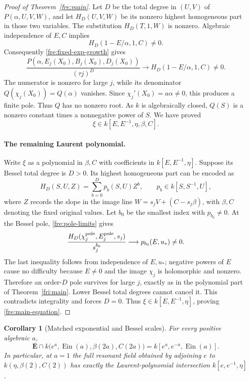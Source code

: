 \documentclass[11pt]{article}
\newtheorem{corollary}[theorem]{Corollary}
\theoremstyle{definition}
\theoremstyle{remark}
\newcommand{\Ein}{\operatorname{Ein}}
\begin{document}
\begin{proof}[Proof of Theorem~\ref{fre:main}]
Let $D$ be the total degree in $(U,V)$ of
$P(\alpha,U,V,W)$, and let $H_D(U,V,W)$ be its nonzero highest
homogeneous part in those two variables.  The substitution
$H_D(T,1,W)$ is nonzero.  Algebraic independence of $E,C$ implies
\[
 H_D(1-E/\alpha,1,C)\ne0.
\]
Consequently \eqref{fre:fixed-exp-growth} gives
\[
 \frac{P(\alpha,E_j(X_0),B_j(X_0),D_j(X_0))}{(\tau j)^D}
 \longrightarrow H_D(1-E/\alpha,1,C)\ne0.
\]
The numerator is nonzero for large $j$, while its denominator
$Q(\chi_j(X_0))=Q(\alpha)$ vanishes.  Since
$\chi_j'(X_0)=a\alpha\ne0$, this produces a finite pole.
Thus $Q$ has no nonzero root.  As $k$ is algebraically closed,
$Q(S)$ is a nonzero constant times a nonnegative power of $S$.
We have proved
\[
 \xi\in k[E,E^{-1},\eta,\beta,C].
\]

\paragraph{The remaining Laurent polynomial.}
Write $\xi$ as a polynomial in $\beta,C$ with coefficients in
$k[E,E^{-1},\eta]$.  Suppose its Bessel total degree is $D>0$.
Its highest homogeneous part can be encoded as
\[
 H_D(S,U,Z)=\sum_{b=0}^{D}p_b(S,U)Z^b,
 \qquad p_b\in k[S,S^{-1},U],
\]
where $Z$ records the slope in the image line
$W=s_jV+(C-s_j\beta)$, with $\beta,C$ denoting the fixed original values.
Let $b_0$ be the smallest index with $p_{b_0}\ne0$.
At the Bessel pole, \eqref{fre:pole-limits} gives
\[
 \frac{H_D(\chi_j^{\rm pole},E_j^{\rm pole},s_j)}{s_j^{b_0}}
 \longrightarrow p_{b_0}(E,u_*)\ne0.
\]
The last inequality follows from independence of $E,u_*$; negative
powers of $E$ cause no difficulty because $E\ne0$ and the image
$\chi_j$ is holomorphic and nonzero.  Therefore an order-$D$
pole survives for large $j$, exactly as in the polynomial part of
Theorem~\ref{fri:main}.  Lower Bessel total degrees cannot cancel it.
This contradicts integrality and forces $D=0$.
Thus $\xi\in k[E,E^{-1},\eta]$, proving
\eqref{fre:main-equation}.
\end{proof}

\begin{corollary}[Matched exponential and Bessel scales]
\label{fre:matched}
For every positive algebraic $a$,
\[
 \overline{\mathbf E}\cap
 k\bigl(e^a,\Ein(a),\beta(2a),C(2a)\bigr)
 =k[e^a,e^{-a},\Ein(a)].
\]
In particular, at $a=1$ the full resonant field obtained by adjoining
$e$ to $k(\eta,\beta(2),C(2))$ has exactly the Laurent-polynomial
intersection $k[e,e^{-1},\eta]$.
\end{corollary}
\end{document}
